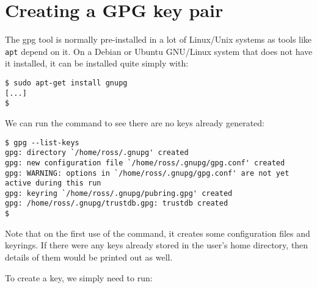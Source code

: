 \documentclass{report}
\begin{document}
\section{Creating a GPG key pair}

The gpg tool is normally pre-installed in a lot of Linux/Unix systems as
tools like \texttt{apt} depend on it. On
a Debian or Ubuntu GNU/Linux system that does not have it installed, it
can be installed quite simply with:

\begin{lstlisting}
$ sudo apt-get install gnupg
[...]
$
\end{lstlisting}

We can run the command to see there are no keys already generated:

\begin{lstlisting}
$ gpg --list-keys
gpg: directory `/home/ross/.gnupg' created
gpg: new configuration file `/home/ross/.gnupg/gpg.conf' created
gpg: WARNING: options in `/home/ross/.gnupg/gpg.conf' are not yet active during this run
gpg: keyring `/home/ross/.gnupg/pubring.gpg' created
gpg: /home/ross/.gnupg/trustdb.gpg: trustdb created
$
\end{lstlisting}

Note that on the first use of the command, it creates some configuration files
and keyrings. If there were any keys already stored in the user's home
directory, then details of them would be printed out as well.

To create a key, we simply need to run:
\end{document}
